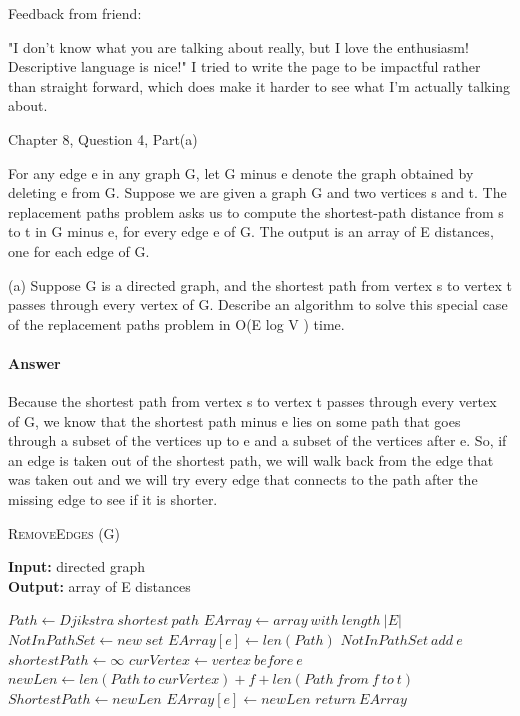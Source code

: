\documentclass{article}
\begin{document}
Feedback from friend:

"I don't know what you are talking about really, but I love the enthusiasm! Descriptive language is nice!" I tried to write the page to be impactful rather than straight forward, which does make it harder to see what I'm actually talking about.

\collab{}

Chapter 8, Question 4, Part(a)

For any edge e in any graph G, let G minus e denote the graph obtained by
deleting e from G. Suppose we are given a graph G and two vertices s
and t. The replacement paths problem asks us to compute the shortest-path
distance from s to t in G minus e, for every edge e of G. The output is an array
of E distances, one for each edge of G.

(a) Suppose G is a directed graph, and the shortest path from vertex s to
vertex t passes through every vertex of G. Describe an algorithm to solve
this special case of the replacement paths problem in O(E log V ) time.

\paragraph{Answer}
Because the shortest path from vertex s to vertex t passes through every vertex
of G, we know that the shortest path minus e lies on some path that goes through
a subset of the vertices up to e and a subset of the vertices after e. So, if
an edge is taken out of the shortest path, we will walk back from the edge that was
taken out and we will try every edge that connects to the path after the missing
edge to see if it is shorter.

\begin{algorithm} \caption{\textsc{RemoveEdges} (G)}\label{alg:seb}
    {\bf Input:} directed graph\\
    {\bf Output:} array of E distances
    \begin{algorithmic}[1]
        \State$Path \gets Djikstra\ shortest\ path$
        \State$EArray \gets array\ with\ length\ |E|$
        \State$NotInPathSet \gets new\ set$
                \State$EArray[e] \gets len(Path)$
            \Else{}
                \State$NotInPathSet\ add\ e$
            \EndIf{}
        \EndFor{}
            \State$shortestPath \gets \infty$
            \State$curVertex \gets vertex\ before\ e$
            \State$newLen \gets len(Path\ to\ curVertex) + f + len(Path\ from\ f\ to\ t) $
                \State$ShortestPath \gets newLen$
                \EndIf{}
                \State$EArray[e] \gets newLen$
            \EndFor{}
        \EndFor{}
        \State$return\ EArray$
    \end{algorithmic}
\end{algorithm}
\end{document}
